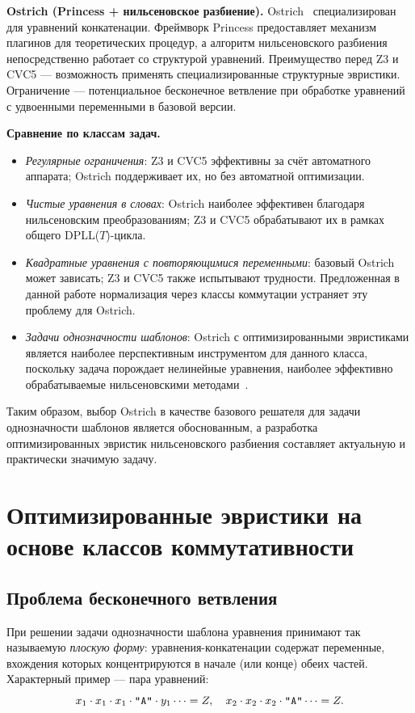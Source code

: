 \documentclass[14pt, russian]{scrartcl}
\begin{document}
\medskip\noindent\textbf{Ostrich (Princess + нильсеновское разбиение).}
Ostrich~\cite{chen2022} специализирован для уравнений конкатенации. Фреймворк
Princess предоставляет механизм плагинов для теоретических процедур, а алгоритм
нильсеновского разбиения непосредственно работает со структурой уравнений.
Преимущество перед Z3 и CVC5 --- возможность применять специализированные
структурные эвристики.
Ограничение --- потенциальное бесконечное ветвление при обработке уравнений
с удвоенными переменными в базовой версии.

\medskip\noindent\textbf{Сравнение по классам задач.}
\begin{itemize}
\item \emph{Регулярные ограничения}: Z3 и CVC5 эффективны за счёт автоматного
  аппарата; Ostrich поддерживает их, но без автоматной оптимизации.
\item \emph{Чистые уравнения в словах}: Ostrich наиболее эффективен благодаря
  нильсеновским преобразованиям; Z3 и CVC5 обрабатывают их в рамках общего
  DPLL($T$)-цикла.
\item \emph{Квадратные уравнения с повторяющимися переменными}: базовый Ostrich
  может зависать; Z3 и CVC5 также испытывают трудности. Предложенная в данной
  работе нормализация через классы коммутации устраняет эту проблему для Ostrich.
\item \emph{Задачи однозначности шаблонов}: Ostrich с оптимизированными эвристиками
  является наиболее перспективным инструментом для данного класса, поскольку
  задача порождает нелинейные уравнения, наиболее эффективно обрабатываемые
  нильсеновскими методами~\cite{abdulla2014}.
\end{itemize}

Таким образом, выбор Ostrich в качестве базового решателя для задачи однозначности
шаблонов является обоснованным, а разработка оптимизированных эвристик нильсеновского
разбиения составляет актуальную и практически значимую задачу.

\section{Оптимизированные эвристики на основе классов коммутативности}

\subsection{Проблема бесконечного ветвления}

При решении задачи однозначности шаблона уравнения принимают так называемую
\emph{плоскую форму}: уравнения-конкатенации содержат переменные, вхождения которых
концентрируются в начале (или конце) обеих частей. Характерный пример --- пара
уравнений:
\[
x_1 \cdot x_1 \cdot x_1 \cdot \texttt{\string"A\string"} \cdot y_1 \cdots = Z,
\quad
x_2 \cdot x_2 \cdot x_2 \cdot \texttt{\string"A\string"} \cdots = Z.
\]
\end{document}

